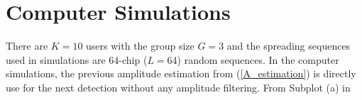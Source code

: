 \documentclass[a4paper,10pt,fleqn, twocolumn]{IEEETran}
\begin{document}
\section{Computer Simulations}
\begin{figure} \label{BER_SNR}
\end{figure}
\begin{figure} \label{BER_A_SNR}
\end{figure}
\begin{figure}
\label{BER_M_SNR}
\end{figure}
There are $K=10$ users with the group size $G=3$ and the spreading
sequences used in simulations are $64$-chip ($L=64$) random
sequences. In the computer simulations, the previous amplitude
estimation from (\ref{A_estimation}) is directly use for the next
detection without any amplitude filtering. From Subplot (a) in
\end{document}
